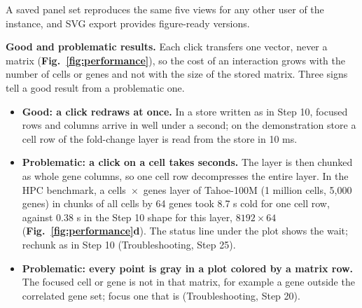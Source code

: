 A saved panel set reproduces the same five views for any other user of the instance, and SVG export provides figure-ready versions.

\textbf{Good and problematic results.} Each click transfers one vector, never a matrix (\textbf{Fig.~\ref{fig:performance}}), so the cost of an interaction grows with the number of cells or genes and not with the size of the stored matrix. Three signs tell a good result from a problematic one.
\begin{itemize}[nosep]
\item \textbf{Good: a click redraws at once.} In a store written as in Step 10, focused rows and columns arrive in well under a second; on the demonstration store a cell row of the fold-change layer is read from the store in 10 ms.
\item \textbf{Problematic: a click on a cell takes seconds.} The layer is then chunked as whole gene columns, so one cell row decompresses the entire layer. In the HPC benchmark, a cells~$\times$~genes layer of Tahoe-100M (1 million cells, 5,000 genes) in chunks of all cells by 64 genes took 8.7 s cold for one cell row, against 0.38 s in the Step 10 shape for this layer, $8192\times64$ (\textbf{Fig.~\ref{fig:performance}d}). The status line under the plot shows the wait; rechunk as in Step 10 (Troubleshooting, Step 25).
\item \textbf{Problematic: every point is gray in a plot colored by a matrix row.} The focused cell or gene is not in that matrix, for example a gene outside the correlated gene set; focus one that is (Troubleshooting, Step 20).
\end{itemize}

\figperformance

